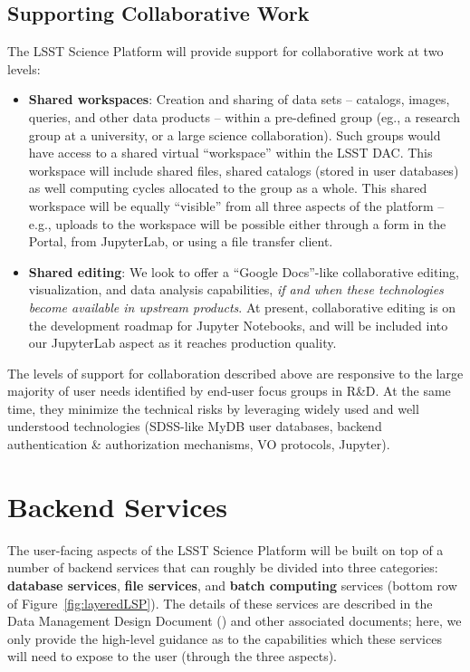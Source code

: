 \documentclass[DM,lsstdraft,toc]{lsstdoc}
\begin{document}
\subsection{Supporting Collaborative Work\label{sec:collab}}

The LSST Science Platform will provide support for collaborative work at two levels:
\begin{itemize}
	\item {\bf Shared workspaces}: Creation and sharing of data sets -- catalogs, images, queries, and other data products -- within a pre-defined group (eg., a research group at a university, or a large science collaboration). Such groups would have access to a shared virtual ``workspace'' within the LSST DAC. This workspace will include shared files, shared catalogs (stored in user databases) as well computing cycles allocated to the group as a whole. This shared workspace will be equally ``visible'' from all three aspects of the platform -- e.g., uploads to the workspace will be possible either through a form in the Portal, from JupyterLab, or using a file transfer client.
	
	\item {\bf Shared editing}: We look to offer a ``Google Docs''-like collaborative editing, visualization, and data analysis capabilities, {\em if and when these technologies become available in upstream products}. At present, collaborative editing is on the development roadmap for Jupyter  Notebooks, and will be included into our JupyterLab aspect as it reaches production quality.
\end{itemize}

The levels of support for collaboration described above are responsive to the large majority of user needs identified by end-user focus groups in R\&D. At the same time, they minimize the technical risks by leveraging widely used and well understood technologies (SDSS-like MyDB user databases, backend authentication \& authorization mechanisms, VO protocols, Jupyter).

\section{Backend Services\label{sec:backend}}

The user-facing aspects of the LSST Science Platform will be built on top of a number of backend services that can roughly be divided into three categories: {\bf database services}, {\bf file services}, and {\bf batch computing} services (bottom row of Figure~\ref{fig:layeredLSP}). The details of these services are described in the Data Management Design Document () and other associated documents; here, we only provide the high-level guidance as to the capabilities which these services will need to expose to the user (through the three aspects).
\end{document}
